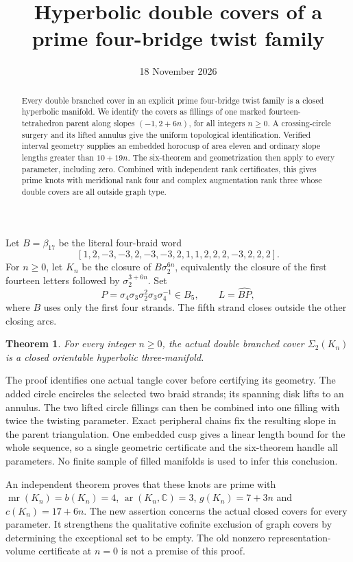 \documentclass[11pt]{article}
\title{Hyperbolic double covers of a prime four-bridge twist family}
\author{}
\date{18 November 2026}
\newtheorem{theorem}{Theorem}
\newcommand{\mr}{\operatorname{mr}}
\newcommand{\ar}{\operatorname{ar}}
\newcommand{\Sig}{\Sigma_2}
\begin{document}
\maketitle
\begin{abstract}
Every double branched cover in an explicit prime four-bridge twist
family is a closed hyperbolic manifold. We identify the covers as
fillings of one marked fourteen-tetrahedron parent along slopes
$(-1,2+6n)$, for all integers $n\ge0$. A crossing-circle surgery and
its lifted annulus give the uniform topological identification.
Verified interval geometry supplies an embedded horocusp of area
eleven and ordinary slope lengths greater than $10+19n$.
The six-theorem and geometrization then apply to every parameter,
including zero. Combined with independent rank certificates, this
gives prime knots with meridional rank four and complex augmentation
rank three whose double covers are all outside graph type.
\end{abstract}
Let $B=\beta_{17}$ be the literal four-braid word
\[
 [1,2,-3,-3,2,-3,-3,2,1,1,2,2,2,-3,2,2,2].
\]
For $n\ge0$, let $K_n$ be the closure of $B\sigma_2^{6n}$, equivalently
the closure of the first fourteen letters followed by $\sigma_2^{3+6n}$.
Set
\[
 P=\sigma_4\sigma_3\sigma_2^2\sigma_3\sigma_4^{-1}\in B_5,
 \qquad L=\widehat{BP},
\]
where $B$ uses only the first four strands.
The fifth strand closes outside the other closing arcs.

\begin{theorem}\label{thm:allcovers}
For every integer $n\ge0$, the actual double branched cover
$\Sig(K_n)$ is a closed orientable hyperbolic three-manifold.
\end{theorem}

The proof identifies one actual tangle cover before certifying its
geometry. The added circle encircles the selected two braid strands;
its spanning disk lifts to an annulus. The two lifted circle fillings
can then be combined into one filling with twice the twisting
parameter. Exact peripheral chains fix the resulting slope in the
parent triangulation. One embedded cusp gives a linear length bound
for the whole sequence, so a single geometric certificate and the
six-theorem handle all parameters. No finite sample of filled
manifolds is used to infer this conclusion.

An independent theorem \cite[Theorem \texttt{thm:main}]{family}
proves that these knots are prime with
$\mr(K_n)=b(K_n)=4$, $\ar(K_n,\mathbb C)=3$,
$g(K_n)=7+3n$ and $c(K_n)=17+6n$.
The new assertion concerns the actual closed covers for every
parameter. It strengthens the qualitative cofinite exclusion of
graph covers by determining the exceptional set to be empty.
The old nonzero representation-volume certificate at $n=0$ is not
a premise of this proof.
\end{document}
